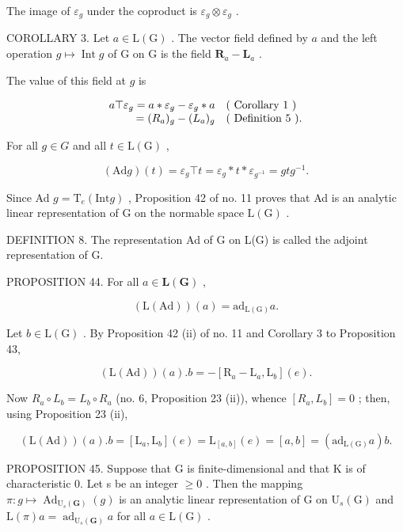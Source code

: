 The image of \(\varepsilon_{g}\) under the coproduct is \(\varepsilon_{g} \otimes \varepsilon_{g}\) .

COROLLARY 3. Let \(a \in \mathrm{L}(\mathrm{G})\) . The vector field defined by \(a\) and the left operation \(g \mapsto \operatorname{Int} g\) of \(\mathrm{G}\) on \(\mathrm{G}\) is the field \(\mathbf{R}_a - \mathbf{L}_a\) .

The value of this field at \(g\) is

\[
\begin{array}{r l} a \top \varepsilon_ {g} = a * \varepsilon_ {g} - \varepsilon_ {g} * a & (\text { Corollary   1 }) \\ = (R _ {a}) _ {g} - (L _ {a}) _ {g} & (\text { Definition   5 }). \end{array}
\]

For all \(g \in G\) and all \(t \in \mathrm{L}(\mathrm{G})\) ,

\[
(\mathrm{Ad} g) (t) = \varepsilon_ {g} \top t = \varepsilon_ {g} * t * \varepsilon_ {g ^ {- 1}} = g t g ^ {- 1}.\tag{25}
\]

Since Ad \(g = \mathrm{T}_{e}(\mathrm{Int} g)\) , Proposition 42 of no. 11 proves that Ad is an analytic linear representation of G on the normable space \(\mathrm{L}(\mathrm{G})\) .

DEFINITION 8. The representation Ad of G on L(G) is called the adjoint representation of G.

PROPOSITION 44. For all \(a \in \mathbf{L}(\mathbf{G})\) ,

\[
(\mathrm{L} (\mathrm{Ad})) (a) = \mathrm{ad} _ {\mathrm{L} (\mathrm{G})} a.
\]

Let \(b \in \mathrm{L}(\mathrm{G})\) . By Proposition 42 (ii) of no. 11 and Corollary 3 to Proposition 43,

\[
(\mathrm{L} (\mathrm{Ad})) (a). b = - [ \mathrm{R} _ {a} - \mathrm{L} _ {a}, \mathrm{L} _ {b} ] (e).
\]

Now \(R_{a} \circ L_{b} = L_{b} \circ R_{a}\) (no. 6, Proposition 23 (ii)), whence \([R_{a}, L_{b}] = 0\) ; then, using Proposition 23 (ii),

\[
(\mathrm{L} (\mathrm{Ad})) (a). b = [ \mathrm{L} _ {a}, \mathrm{L} _ {b} ] (e) = \mathrm{L} _ {[ a, b ]} (e) = [ a, b ] = (\mathrm{ad} _ {\mathrm{L} (\mathrm{G})} a) b.
\]

PROPOSITION 45. Suppose that G is finite-dimensional and that K is of characteristic 0. Let s be an integer \(\geqslant0\) . Then the mapping \(\pi: g \mapsto \operatorname{Ad}_{\mathrm{U}_{s}(\mathbf{G})}(g)\) is an analytic linear representation of G on \(\mathrm{U}_{s}(\mathrm{G})\) and \(\mathrm{L}(\pi)a = \operatorname{ad}_{\mathrm{U}_{s}(\mathbf{G})}a\) for all \(a \in \mathrm{L}(\mathrm{G})\) .

